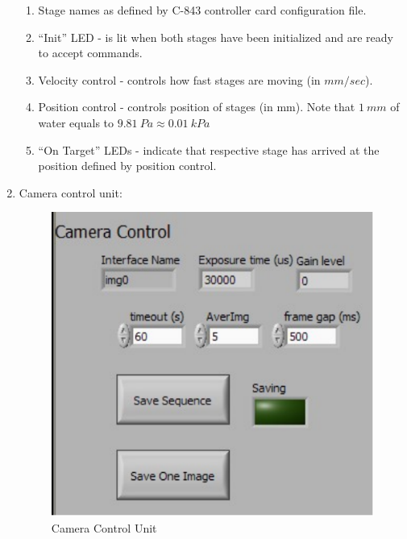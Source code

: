 \begin{enumerate}
	\begin{enumerate}
		\item Stage names as defined by C-843 controller card configuration file.
		\item ``Init'' LED - is lit when both stages have been initialized and are ready to accept commands.
		\item Velocity control - controls how fast stages are moving (in $mm/sec$).
		\item Position control - controls position of stages (in mm). Note that $1~mm$ of water equals to $9.81~Pa \approx 0.01~kPa$
		\item ``On Target'' LEDs - indicate that respective stage has arrived at the position defined by position control.
	\end{enumerate}
	
	\item Camera control unit:
	
	\begin{figure}
		\centering
			\includegraphics{figs/labvamp_cam.pdf}
		\caption{Camera Control Unit}
		\label{fig:labvamp_cam}
	\end{figure}


\end{enumerate}
